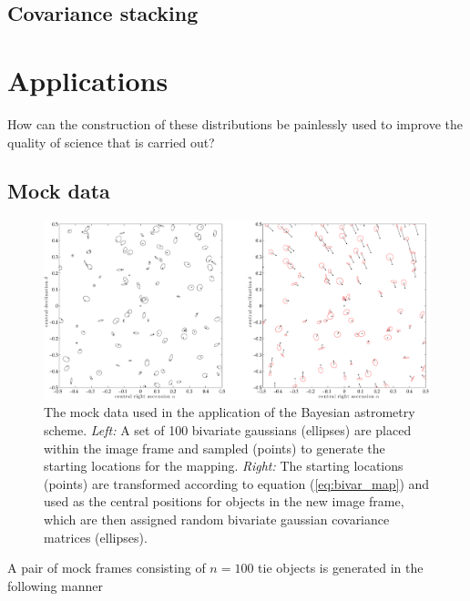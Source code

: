 \documentclass[manuscript]{aastex}
\begin{document}
\subsection{Covariance stacking}

\section{Applications}
How can the construction of these distributions be painlessly used to improve the quality of science that is carried out?

\subsection{Mock data}
\begin{figure}[h]
\centering
\includegraphics[width=\linewidth]{figures/test_data.pdf}
\caption{The mock data used in the application of the Bayesian astrometry scheme. \emph{Left:} A set of 100 bivariate gaussians (ellipses) are placed within the image frame and sampled (points) to generate the starting locations for the mapping. \emph{Right:} The starting locations (points) are transformed according to equation (\ref{eq:bivar_map}) and used as the central positions for objects in the new image frame, which are then assigned random bivariate gaussian covariance matrices (ellipses). }\label{fig:test_data}
\end{figure}
A pair of mock frames consisting of $n=100$ tie objects is generated in the following manner
\end{document}
